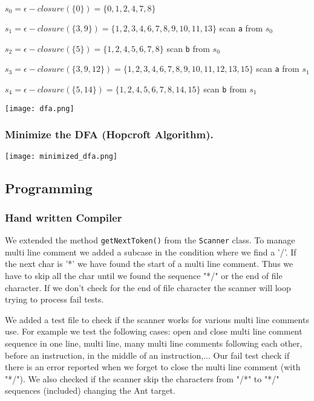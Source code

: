 \documentclass[a4paper, 12pt]{article}
\begin{document}
            $s_{0} = \epsilon-closure(\{0\}) = \{0,1,2,4,7,8\}$
            
            $s_{1} = \epsilon-closure(\{3,9\}) = \{1,2,3,4,6,7,8,9,10,11,13\}$ scan \texttt{a} from $s_{0}$
            
            $s_{2} = \epsilon-closure(\{5\}) = \{1,2,4,5,6,7,8\}$ scan \texttt{b} from $s_{0}$
            
            $s_{3} = \epsilon-closure(\{3,9,12\}) = \{1,2,3,4,6,7,8,9,10,11,12,13,15\}$ scan \texttt{a} from $s_{1}$
            
            $s_{4} = \epsilon-closure(\{5,14\}) = \{1,2,4,5,6,7,8,14,15\}$ scan \texttt{b} from $s_{1}$

            \begin{center}
                \texttt{[image: dfa.png]}
            \end{center}
            
        \subsubsection{Minimize the DFA (Hopcroft Algorithm).}
            
            \begin{center}
                \texttt{[image: minimized\_dfa.png]}
            \end{center}
    \subsection{Programming}
    
        \subsubsection{Hand written Compiler}
        
            We extended the method \texttt{getNextToken()} from the \texttt{Scanner} class. To manage multi line comment we added a subcase in the condition where we find a '/'. If the next char is '*' we have found the start of a multi line comment. Thus we have to skip all the char until we found the sequence "*/" or the end of file character. If we don't check for the end of file character the scanner will loop trying to process fail tests.
            
            We added a test file to check if the scanner works for various multi line comments use. For example we test the following cases: open and close multi line comment sequence in one line, multi line, many multi line comments following each other, before an instruction, in the middle of an instruction,... Our fail test check if there is an error reported when we forget to close the multi line comment (with "*/"). We also checked if the scanner skip the characters from "/*" to "*/" sequences (included) changing the Ant target.
            
\end{document}

